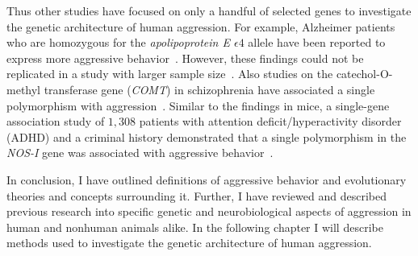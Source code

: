 Thus other studies have focused on only a handful of selected genes to investigate the genetic architecture of human aggression.
For example, Alzheimer patients who are homozygous for the \textit{apolipoprotein E $\epsilon 4$} allele have been reported to express more aggressive behavior~\cite{Craig2004,VanDerFlier2006}.
However, these findings could not be replicated in a study with larger sample size~\cite{Hollingworth2006}.
Also studies on the catechol-O-methyl transferase gene (\textit{COMT}) in schizophrenia have associated a single polymorphism with aggression~\cite{Hirata2013,Calati2011}.
Similar to the findings in mice, a single-gene association study of $1,308$ patients with attention deficit/hyperactivity disorder (ADHD) and a criminal history demonstrated that a single polymorphism in the \textit{NOS-I} gene was associated with aggressive behavior~\cite{Reif2009}.

\bigskip

In conclusion, I have outlined definitions of aggressive behavior and evolutionary theories and concepts surrounding it.
Further, I have reviewed and described previous research into specific genetic and neurobiological aspects of aggression in human and nonhuman animals alike.
In the following chapter I will describe methods used to investigate the genetic architecture of human aggression.
